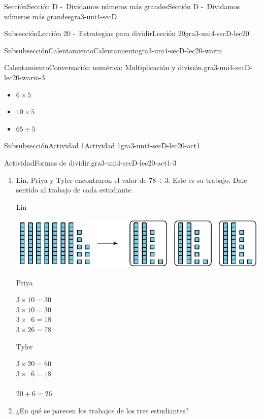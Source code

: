 \documentclass[twoside,10pt,]{article}
\begin{document}
\begin{sectionptx}{Sección}{Sección D -~Dividamos números más grandes}{}{Sección D -~Dividamos números más grandes}{}{}{gra3-uni4-secD}
\begin{subsectionptx}{Subsección}{Lección 20 -~Estrategias para dividir}{}{Lección 20}{}{}{gra3-uni4-secD-lec20}
\begin{subsubsectionptx}{Subsubsección}{Calentamiento}{}{Calentamiento}{}{}{gra3-uni4-secD-lec20-warm}
\begin{exploration}{Calentamiento}{Conversación numérica: Multiplicación y división.}{gra3-uni4-secD-lec20-warm-3}
\begin{itemize}[label=\textbullet]
\item{}\(\displaystyle 6\times 5\)%
\item{}\(\displaystyle 10\times 5\)%
\item{}\(\displaystyle 65\div 5\)%
\end{itemize}
\end{exploration}%
\end{subsubsectionptx}
%
%
\typeout{************************************************}
\typeout{************************************************}
%
\begin{subsubsectionptx}{Subsubsección}{Actividad 1}{}{Actividad 1}{}{}{gra3-uni4-secD-lec20-act1}
\begin{activity}{Actividad}{Formas de dividir.}{gra3-uni4-secD-lec20-act1-3}%
%
\begin{enumerate}
\item{}Lin, Priya y Tyler encontraron el valor de \(78 \div 3\). Este es su trabajo. Dale sentido al trabajo de cada estudiante.%
\par
Lin%
\par
\begin{image}{0}{1}{0}{}%
\includegraphics[width=\linewidth]{external/svg-source/tikz-file-149344.pdf}
\end{image}%
%
\begin{sidebyside}{2}{0}{0}{0}%
\begin{sbspanel}{0.5}%
Priya%
\par
\(3\times 10 = 30\)\\
 \(3\times 10 = 30\)\\
 \(3\times \phantom{0}6 = 18\)\\
 \(\overline {3 \times 26 =78}\)%
\end{sbspanel}%
\begin{sbspanel}{0.5}%
Tyler%
\par
\(3\times 20 = 60\)\\
 \(3\times \phantom{0}6 = 18\)\\
 \\
 \(20 + 6 = 26\)%
\end{sbspanel}%
\end{sidebyside}%
\item{}¿En qué se parecen los trabajos de los tres estudiantes?%

\end{enumerate}
\end{activity}
\end{subsubsectionptx}
\end{subsectionptx}
\end{sectionptx}
\end{document}
